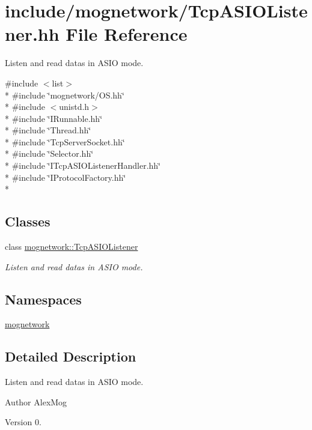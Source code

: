 \hypertarget{_tcp_a_s_i_o_listener_8hh}{\section{include/mognetwork/\-Tcp\-A\-S\-I\-O\-Listener.hh File Reference}
\label{_tcp_a_s_i_o_listener_8hh}
}


Listen and read datas in A\-S\-I\-O mode.  


{\ttfamily \#include $<$list$>$}\\*
{\ttfamily \#include \char`\"{}mognetwork/\-O\-S.\-hh\char`\"{}}\\*
{\ttfamily \#include $<$unistd.\-h$>$}\\*
{\ttfamily \#include \char`\"{}I\-Runnable.\-hh\char`\"{}}\\*
{\ttfamily \#include \char`\"{}Thread.\-hh\char`\"{}}\\*
{\ttfamily \#include \char`\"{}Tcp\-Server\-Socket.\-hh\char`\"{}}\\*
{\ttfamily \#include \char`\"{}Selector.\-hh\char`\"{}}\\*
{\ttfamily \#include \char`\"{}I\-Tcp\-A\-S\-I\-O\-Listener\-Handler.\-hh\char`\"{}}\\*
{\ttfamily \#include \char`\"{}I\-Protocol\-Factory.\-hh\char`\"{}}\\*
\subsection*{Classes}
\begin{DoxyCompactItemize}
\item 
class \hyperlink{classmognetwork_1_1_tcp_a_s_i_o_listener}{mognetwork\-::\-Tcp\-A\-S\-I\-O\-Listener}
\begin{DoxyCompactList}\small\item\em Listen and read datas in A\-S\-I\-O mode. \end{DoxyCompactList}\end{DoxyCompactItemize}
\subsection*{Namespaces}
\begin{DoxyCompactItemize}
\item 
\hyperlink{namespacemognetwork}{mognetwork}
\end{DoxyCompactItemize}


\subsection{Detailed Description}
Listen and read datas in A\-S\-I\-O mode. \begin{DoxyAuthor}{Author}
Alex\-Mog 
\end{DoxyAuthor}
\begin{DoxyVersion}{Version}
0. 
\end{DoxyVersion}
